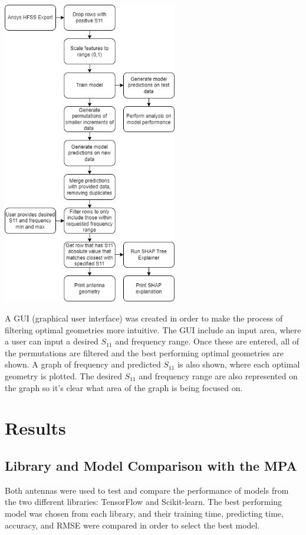 \documentclass[conference]{IEEEtran}
\newenvironment{Figure}
    {\par\medskip\noindent\minipage{\linewidth}}
    {\endminipage\par\medskip}
\begin{document}
\begin{Figure}
\centering
\includegraphics[width=3.0in]{methodology}
\label{data_flow}
\end{Figure}

A GUI (graphical user interface) was created in order to make the process of filtering optimal geometries more intuitive. The GUI include an input area, where a user can input a desired $S_{11}$ and frequency range. Once these are entered, all of the permutations are filtered and the best performing optimal geometries are shown. A graph of frequency and predicted $S_{11}$ is also shown, where each optimal geometry is plotted. The desired $S_{11}$ and frequency range are also represented on the graph so it's clear what area of the graph is being focused on.


\section{Results}
\subsection{Library and Model Comparison with the MPA}
Both antennas were used to test and compare the performance of models from the two different libraries: TensorFlow and Scikit-learn. The best performing model was chosen from each library, and their training time, predicting time, accuracy, and RMSE were compared in order to select the best model.
\end{document}
